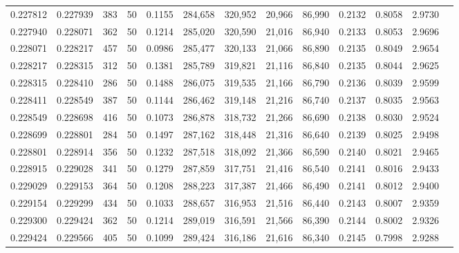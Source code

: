 \begin{tabular}{rrrrrrrrrrrrr}
0.227812 & 0.227939 &   383 &  50 &                                     0.1155 & 284,658 & 320,952 &  20,966 &  86,990 & 0.2132 & 0.8058 & 2.9730 \\
0.227940 & 0.228071 &   362 &  50 &                                     0.1214 & 285,020 & 320,590 &  21,016 &  86,940 & 0.2133 & 0.8053 & 2.9696 \\
0.228071 & 0.228217 &   457 &  50 &                                     0.0986 & 285,477 & 320,133 &  21,066 &  86,890 & 0.2135 & 0.8049 & 2.9654 \\
0.228217 & 0.228315 &   312 &  50 &                                     0.1381 & 285,789 & 319,821 &  21,116 &  86,840 & 0.2135 & 0.8044 & 2.9625 \\
0.228315 & 0.228410 &   286 &  50 &                                     0.1488 & 286,075 & 319,535 &  21,166 &  86,790 & 0.2136 & 0.8039 & 2.9599 \\
0.228411 & 0.228549 &   387 &  50 &                                     0.1144 & 286,462 & 319,148 &  21,216 &  86,740 & 0.2137 & 0.8035 & 2.9563 \\
0.228549 & 0.228698 &   416 &  50 &                                     0.1073 & 286,878 & 318,732 &  21,266 &  86,690 & 0.2138 & 0.8030 & 2.9524 \\
0.228699 & 0.228801 &   284 &  50 &                                     0.1497 & 287,162 & 318,448 &  21,316 &  86,640 & 0.2139 & 0.8025 & 2.9498 \\
0.228801 & 0.228914 &   356 &  50 &                                     0.1232 & 287,518 & 318,092 &  21,366 &  86,590 & 0.2140 & 0.8021 & 2.9465 \\
0.228915 & 0.229028 &   341 &  50 &                                     0.1279 & 287,859 & 317,751 &  21,416 &  86,540 & 0.2141 & 0.8016 & 2.9433 \\
0.229029 & 0.229153 &   364 &  50 &                                     0.1208 & 288,223 & 317,387 &  21,466 &  86,490 & 0.2141 & 0.8012 & 2.9400 \\
0.229154 & 0.229299 &   434 &  50 &                                     0.1033 & 288,657 & 316,953 &  21,516 &  86,440 & 0.2143 & 0.8007 & 2.9359 \\
0.229300 & 0.229424 &   362 &  50 &                                     0.1214 & 289,019 & 316,591 &  21,566 &  86,390 & 0.2144 & 0.8002 & 2.9326 \\
0.229424 & 0.229566 &   405 &  50 &                                     0.1099 & 289,424 & 316,186 &  21,616 &  86,340 & 0.2145 & 0.7998 & 2.9288 \\

\end{tabular}
